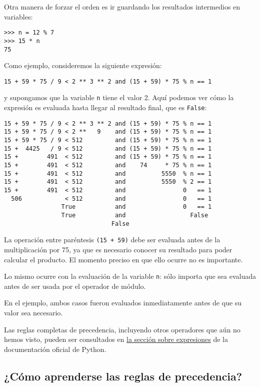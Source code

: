 Otra manera de forzar el orden es ir guardando los resultados
intermedios en variables:
\begin{lstlisting}
>>> n = 12 % 7
>>> 15 * n
75
\end{lstlisting}

Como ejemplo, consideremos la siguiente expresión:
\begin{lstlisting}
15 + 59 * 75 / 9 < 2 ** 3 ** 2 and (15 + 59) * 75 % n == 1
\end{lstlisting}
y supongamos que la variable \lstinline!n! tiene el valor 2. Aquí
podemos ver cómo la expresión es evaluada hasta llegar al resultado
final, que es \lstinline!False!:

\begin{lstlisting}
15 + 59 * 75 / 9 < 2 ** 3 ** 2 and (15 + 59) * 75 % n == 1
15 + 59 * 75 / 9 < 2 **   9    and (15 + 59) * 75 % n == 1
15 + 59 * 75 / 9 < 512         and (15 + 59) * 75 % n == 1
15 +  4425   / 9 < 512         and (15 + 59) * 75 % n == 1
15 +        491  < 512         and (15 + 59) * 75 % n == 1
15 +        491  < 512         and    74     * 75 % n == 1
15 +        491  < 512         and          5550  % n == 1
15 +        491  < 512         and          5550  % 2 == 1
15 +        491  < 512         and                0   == 1
  506            < 512         and                0   == 1
                True           and                0   == 1
                True           and                  False
                              False
\end{lstlisting}

La operación entre paréntesis \lstinline!(15 + 59)! debe ser evaluada
antes de la multiplicación por 75, ya que es necesario conocer su
resultado para poder calcular el producto. El momento preciso en que
ello ocurre no es importante.

Lo mismo ocurre con la evaluación de la variable \lstinline!n!: sólo
importa que sea evaluada antes de ser usada por el operador de módulo.

En el ejemplo, ambos casos fueron evaluados inmediatamente antes de que
su valor sea necesario.

Las reglas completas de precedencia, incluyendo otros operadores que aún
no hemos visto, pueden ser consultados en
\href{http://docs.python.org/reference/expressions.html\#summary}{la
sección sobre expresiones} de la documentación oficial de Python.

\subsection{¿Cómo aprenderse las reglas de precedencia?}

